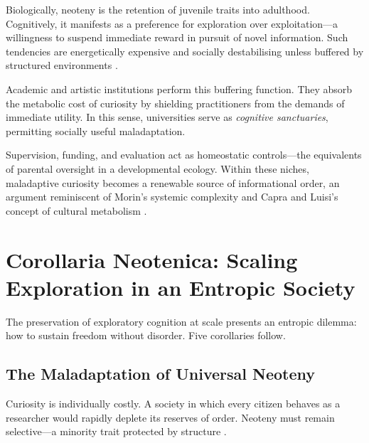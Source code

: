 \documentclass[12pt,a4paper]{article}
\begin{document}
Biologically, neoteny is the retention of juvenile traits into adulthood. 
Cognitively, it manifests as a preference for exploration over exploitation---a willingness 
to suspend immediate reward in pursuit of novel information. 
Such tendencies are energetically expensive and socially destabilising 
unless buffered by structured environments \citep{gopnik2025evolution}.

Academic and artistic institutions perform this buffering function. 
They absorb the metabolic cost of curiosity by shielding practitioners from the demands of 
immediate utility.  In this sense, universities serve as 
\textit{cognitive sanctuaries}, permitting socially useful maladaptation. 

Supervision, funding, and evaluation act as homeostatic controls---the equivalents of 
parental oversight in a developmental ecology. 
Within these niches, maladaptive curiosity becomes a renewable source of informational order,
an argument reminiscent of Morin’s systemic complexity \citep{morin2008method}
and Capra and Luisi’s concept of cultural metabolism \citep{capra2021systems}.

\section{Corollaria Neotenica: Scaling Exploration in an Entropic Society}

The preservation of exploratory cognition at scale presents an entropic dilemma:
how to sustain freedom without disorder.  
Five corollaries follow.

\subsection{The Maladaptation of Universal Neoteny}

Curiosity is individually costly.  A society in which every citizen behaves as a researcher
would rapidly deplete its reserves of order.
Neoteny must remain selective---a minority trait protected by structure
\citep{georgescu1971entropy}.
\end{document}
